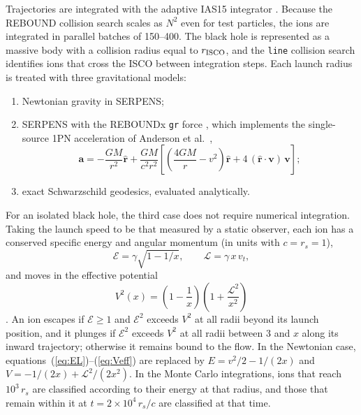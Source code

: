 \documentclass[twocolumn,showpacs,preprintnumbers,amsmath,amssymb]{revtex4}
\begin{document}
Trajectories are integrated with the adaptive IAS15 integrator \cite{ReinSpiegel2015}. Because the REBOUND collision search scales as $N^2$ even for test particles, the ions are integrated in parallel batches of 150--400. The black hole is represented as a massive body with a collision radius equal to $r_{\rm ISCO}$, and the \texttt{line} collision search identifies ions that cross the ISCO between integration steps. Each launch radius is treated with three gravitational models:
\begin{enumerate}
\item Newtonian gravity in SERPENS;
\item SERPENS with the REBOUNDx \texttt{gr} force \cite{Tamayo_2020}, which implements the single-source 1PN acceleration of Anderson et al.\ \cite{Anderson1975},
\begin{equation}
\label{eq:1pn}
\mathbf{a} = -\frac{GM}{r^2}\hat{\mathbf r} + \frac{GM}{c^2 r^2}\left[\left(\frac{4GM}{r}-v^2\right)\hat{\mathbf r} + 4\,(\hat{\mathbf r}\cdot\mathbf v)\,\mathbf v\right];
\end{equation}
\item exact Schwarzschild geodesics, evaluated analytically.
\end{enumerate}
For an isolated black hole, the third case does not require numerical integration. Taking the launch speed to be that measured by a static observer, each ion has a conserved specific energy and angular momentum (in units with $c = r_s = 1$),
\begin{equation}
\label{eq:EL}
\mathcal{E} = \gamma\sqrt{1-1/x}, \qquad \mathcal{L} = \gamma\, x\, v_t ,
\end{equation}
and moves in the effective potential
\begin{equation}
\label{eq:Veff}
V^2(x) = \left(1-\frac{1}{x}\right)\left(1+\frac{\mathcal{L}^2}{x^2}\right)
\end{equation}
\cite{ShapiroTeukolsky1983}. An ion escapes if $\mathcal{E}\ge 1$ and $\mathcal{E}^2$ exceeds $V^2$ at all radii beyond its launch position, and it plunges if $\mathcal{E}^2$ exceeds $V^2$ at all radii between 3 and $x$ along its inward trajectory; otherwise it remains bound to the flow. In the Newtonian case, equations~(\ref{eq:EL})--(\ref{eq:Veff}) are replaced by $E = v^2/2 - 1/(2x)$ and $V = -1/(2x)+\mathcal{L}^2/(2x^2)$. In the Monte Carlo integrations, ions that reach $10^3\,r_s$ are classified according to their energy at that radius, and those that remain within it at $t = 2\times10^4\,r_s/c$ are classified at that time.
\end{document}
